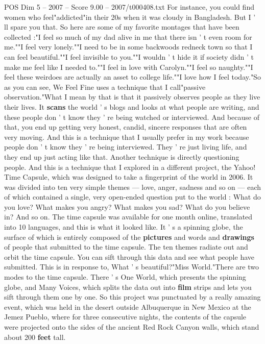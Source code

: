 \begin{textsample}{POS Dim 5 – 2007 – Score 9.00 – 2007/t000408.txt}
For instance, you could find women who feel"addicted"in their 20s when it was cloudy in Bangladesh.
But I ' ll spare you that.
So here are some of my favorite montages that have been collected :"I feel so much of my dad alive in me that there isn ' t even room for me.""I feel very lonely.""I need to be in some backwoods redneck town so that I can feel beautiful.""I feel invisible to you.""I wouldn ' t hide it if society didn ' t make me feel like I needed to.""I feel in love with Carolyn.""I feel so naughty.""I feel these weirdoes are actually an asset to college life.""I love how I feel today."So as you can see, We Feel Fine uses a technique that I call"passive observation."What I mean by that is that it passively observes people as they live their lives.
It \textbf{scans} the world ' s blogs and looks at what people are writing, and these people don ' t know they ' re being watched or interviewed.
And because of that, you end up getting very honest, candid, sincere responses that are often very moving.
And this is a technique that I usually prefer in my work because people don ' t know they ' re being interviewed.
They ' re just living life, and they end up just acting like that.
Another technique is directly questioning people.
And this is a technique that I explored in a different project, the Yahoo!
Time Capsule, which was designed to take a fingerprint of the world in 2006.
It was divided into ten very simple themes — love, anger, sadness and so on — each of which contained a single, very open-ended question put to the world : What do you love?
What makes you angry?
What makes you sad?
What do you believe in?
And so on.
The time capsule was available for one month online, translated into 10 languages, and this is what it looked like.
It ' s a spinning globe, the surface of which is entirely composed of the \textbf{pictures} and words and \textbf{drawings} of people that submitted to the time capsule.
The ten themes radiate out and orbit the time capsule.
You can sift through this data and see what people have submitted.
This is in response to, What ' s beautiful?"Miss World."There are two modes to the time capsule.
There ' s One World, which presents the spinning globe, and Many Voices, which splits the data out into \textbf{film} strips and lets you sift through them one by one.
So this project was punctuated by a really amazing event, which was held in the desert outside Albuquerque in New Mexico at the Jemez Pueblo, where for three consecutive nights, the contents of the capsule were projected onto the sides of the ancient Red Rock Canyon walls, which stand about 200 \textbf{feet} tall.

\end{textsample}
